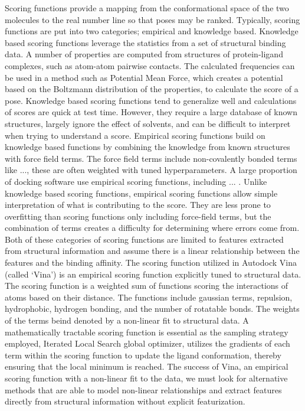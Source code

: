 \documentclass[journal=jcisd8,manuscript=article]{achemso}
\begin{document}
Scoring functions provide a mapping from the conformational space of the two molecules to the real number line so that poses may be ranked. Typically, scoring functions are put into two categories; empirical and knowledge based. Knowledge based scoring functions leverage the statistics from a set of structural binding data. A number of properties are computed from structures of protein-ligand complexes, such as atom-atom pairwise contacts. The calculated frequencies can be used in a method such as Potential Mean Force, which creates a potential based on the Boltzmann distribution of the properties, to calculate the score of a pose. Knowledge based scoring functions tend to generalize well and calculations of scores are quick at test time. However, they require a large database of known structures, largely ignore the effect of solvents, and can be difficult to interpret when trying to understand a score. Empirical scoring functions build on knowledge based functions by combining the knowledge from known structures with force field terms. The force field terms include non-covalently bonded terms like ..., these are often weighted with tuned hyperparameters. A large proportion of docking software use empirical scoring functions, including ... \cite{}. Unlike knowledge based scoring functions, empirical scoring functions allow simple interpretation of what is contributing to the score. They are less prone to overfitting than scoring functions only including force-field terms, but the combination of terms creates a difficulty for determining where errors come from. Both of these categories of scoring functions are limited to features extracted from structural information and assume there is a linear relationship between the features and the binding affinity. The scoring function utilized in Autodock Vina (called `Vina') is an empirical scoring function explicitly tuned to structural data\cite{trott2010autodock}. The scoring function is a weighted sum of functions scoring the interactions of atoms based on their distance. The functions include gaussian terms, repulsion, hydrophobic, hydrogen bonding, and the number of rotatable bonds. The weights of the terms beind denoted by a non-linear fit to structural data. A mathematically tractable scoring function is essential as the sampling strategy employed, Iterated Local Search global optimizer, utilizes the gradients of each term within the scoring function to update the ligand conformation, thereby ensuring that the local minimum is reached. The success of Vina, an empirical scoring function with a non-linear fit to the data, we must look for alternative methods that are able to model non-linear relationships and extract features directly from structural information without explicit featurization.
\end{document}
